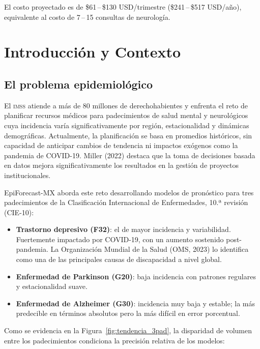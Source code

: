 \documentclass[12pt, letterpaper]{article}
\newcommand{\imss}{\textnormal{\textsc{imss}}}
\newcommand{\figref}[1]{Figura~\ref{#1}}
\begin{document}
El costo proyectado es de \$61\,--\,\$130 USD/trimestre (\$241\,--\,\$517 USD/año), equivalente al costo de 7\,--\,15 consultas de neurología.

\newpage
\section{Introducción y Contexto}\label{sec:introduccion}

\subsection{El problema epidemiológico}

El {\imss} atiende a más de 80 millones de derechohabientes y enfrenta el reto de planificar recursos médicos para padecimientos de salud mental y neurológicos cuya incidencia varía significativamente por región, estacionalidad y dinámicas demográficas. Actualmente, la planificación se basa en promedios históricos, sin capacidad de anticipar cambios de tendencia ni impactos exógenos como la pandemia de COVID-19. Miller (2022) destaca que la toma de decisiones basada en datos mejora significativamente los resultados en la gestión de proyectos institucionales.

EpiForecast-MX aborda este reto desarrollando modelos de pronóstico para tres padecimientos de la Clasificación Internacional de Enfermedades, 10.ª revisión (CIE-10):

\begin{itemize}[noitemsep]
    \item \textbf{Trastorno depresivo (F32)}: el de mayor incidencia y variabilidad. Fuertemente impactado por COVID-19, con un aumento sostenido post-pandemia. La Organización Mundial de la Salud (OMS, 2023) lo identifica como una de las principales causas de discapacidad a nivel global.
    \item \textbf{Enfermedad de Parkinson (G20)}: baja incidencia con patrones regulares y estacionalidad suave.
    \item \textbf{Enfermedad de Alzheimer (G30)}: incidencia muy baja y estable; la más predecible en términos absolutos pero la más difícil en error porcentual.
\end{itemize}

Como se evidencia en la \figref{fig:tendencia_3pad}, la disparidad de volumen entre los padecimientos condiciona la precisión relativa de los modelos:
\end{document}
